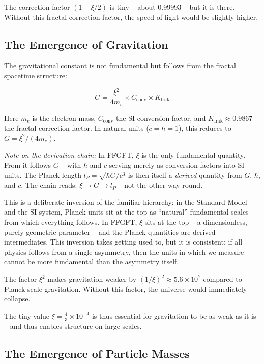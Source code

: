 	The correction factor $(1 - \xi/2)$ is tiny -- about 0.99993 -- but it is there. Without this fractal correction factor, the speed of light would be slightly higher.
	
	\subsection{The Emergence of Gravitation}
	
	The gravitational constant is not fundamental but follows from the fractal spacetime structure:
	
	\begin{equation}
		G = \frac{\xi^2}{4 m_e} \times C_{\text{conv}} \times K_{\text{frak}}
	\end{equation}
	
	Here $m_e$ is the electron mass, $C_{\text{conv}}$ the SI conversion factor, and $K_{\text{frak}} \approx 0.9867$ the fractal correction factor. In natural units ($c = \hbar = 1$), this reduces to $G = \xi^2/(4 m_e)$.
	
	\textit{Note on the derivation chain:} In FFGFT, $\xi$ is the only fundamental quantity. From it follows $G$ -- with $\hbar$ and $c$ serving merely as conversion factors into SI units. The Planck length $l_P = \sqrt{\hbar G/c^3}$ is then itself a \textit{derived} quantity from $G$, $\hbar$, and $c$. The chain reads: $\xi \to G \to l_P$ -- not the other way round.
	
	This is a deliberate inversion of the familiar hierarchy: in the Standard Model and the SI system, Planck units sit at the top as ``natural'' fundamental scales from which everything follows. In FFGFT, $\xi$ sits at the top -- a dimensionless, purely geometric parameter -- and the Planck quantities are derived intermediates. This inversion takes getting used to, but it is consistent: if all physics follows from a single asymmetry, then the units in which we measure cannot be more fundamental than the asymmetry itself.
	
	The factor $\xi^2$ makes gravitation weaker by $(1/\xi)^2 \approx 5.6 \times 10^7$ compared to Planck-scale gravitation. Without this factor, the universe would immediately collapse.
	
	The tiny value $\xi = \frac{4}{3} \times 10^{-4}$ is thus essential for gravitation to be as weak as it is -- and thus enables structure on large scales.
	
	\subsection{The Emergence of Particle Masses}
	
